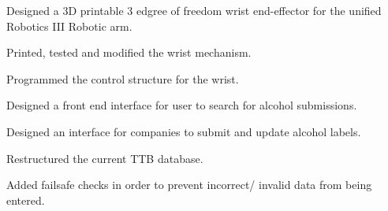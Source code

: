 \documentclass[]{deedy-resume-openfont}
\begin{document}
\begin{minipage}[t]{0.66\textwidth}
\begin{tightemize} 
\item Designed a 3D printable 3 edgree of freedom wrist end-effector for the unified Robotics III Robotic arm.
\item Printed, tested and modified the wrist mechanism.
\item Programmed the control structure for the wrist.
\end{tightemize}

\begin{tightemize} 
\item Designed a front end interface for user to search for alcohol submissions.
\item Designed an interface for companies to submit and update alcohol labels.
\item Restructured the current TTB database.
\item Added failsafe checks in order to prevent incorrect/ invalid data from being entered.
\end{tightemize}
\end{minipage} 
\end{document}
